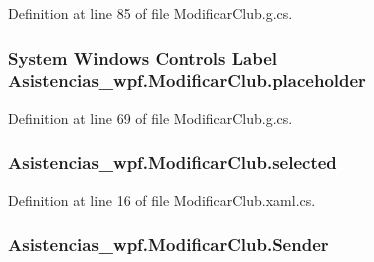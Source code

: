 Definition at line 85 of file Modificar\-Club.\-g.\-cs.

\hypertarget{class_asistencias__wpf_1_1_modificar_club_a2b2c3976252b8870397a47d96673c856}{
\subsubsection[{placeholder}]{\setlength{\rightskip}{0pt plus 5cm}System Windows Controls Label Asistencias\-\_\-wpf.\-Modificar\-Club.\-placeholder\hspace{0.3cm}{\ttfamily [package]}}}\label{class_asistencias__wpf_1_1_modificar_club_a2b2c3976252b8870397a47d96673c856}


Definition at line 69 of file Modificar\-Club.\-g.\-cs.

\hypertarget{class_asistencias__wpf_1_1_modificar_club_ad8a6d484077e99675c010a8d3a98de61}{
\subsubsection[{selected}]{ Asistencias\-\_\-wpf.\-Modificar\-Club.\-selected\hspace{0.3cm}{\ttfamily [private]}}}\label{class_asistencias__wpf_1_1_modificar_club_ad8a6d484077e99675c010a8d3a98de61}


Definition at line 16 of file Modificar\-Club.\-xaml.\-cs.

\hypertarget{class_asistencias__wpf_1_1_modificar_club_a17c1749aa4cdc0bc9697d3a9ebc14b1a}{
\subsubsection[{Sender}]{ Asistencias\-\_\-wpf.\-Modificar\-Club.\-Sender\hspace{0.3cm}{\ttfamily [private]}}}\label{class_asistencias__wpf_1_1_modificar_club_a17c1749aa4cdc0bc9697d3a9ebc14b1a}


